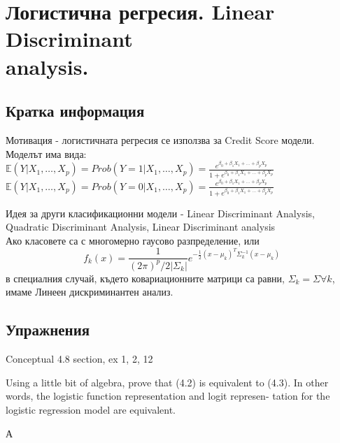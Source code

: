 \section{Логистична регресия. Linear Discriminant \\ analysis.}

	\subsection{Кратка информация}
	Мотивация - логистичната регресия се използва за Credit Score модели.\\
	Моделът има вида: \\
	$\mathbb{E}(Y|X_1, \dots, X_p) = Prob(Y=1|X_1, \dots, X_p) = \frac{e^{\beta_0 + \beta_1 X_1 + \dots + \beta_p X_p}}{1+ e^{\beta_0 + \beta_1 X_1 + \dots + \beta_p X_p}} $ \\
	$\mathbb{E}(Y|X_1, \dots, X_p) = Prob(Y=0|X_1, \dots, X_p) = \frac{e^{\beta_0 + \beta_1 X_1 + \dots + \beta_p X_p}}{1+ e^{\beta_0 + \beta_1 X_1 + \dots + \beta_p X_p}} $
	
	Идея за други класификационни модели - Linear Discriminant Analysis, Quadratic Discriminant Analysis, 
	Linear Discriminant analysis \\
	Ако класовете са с многомерно гаусово разпределение, или
	$$f_k(x) = \frac{1}{(2\pi)^p/2 \left | \Sigma_k  \right |} e^{-\frac{1}{2} (x-\mu_k)^T \Sigma_k^{-1}(x-\mu_k)} $$
	в специалния случай, където ковариационните матрици са равни, $\Sigma_k = \Sigma \forall k$, имаме 
	Линеен дискриминантен анализ.
	
	
	\subsection{Упражнения}
	Conceptual 4.8 section, ex 1, 2, 12 \\

	\begin{exercise}
			Using a little bit of algebra, prove that (4.2) is equivalent to (4.3). In
		other words, the logistic function representation and logit represen-
		tation for the logistic regression model are equivalent.
	\end{exercise}

	\begin{exercise}
		А
	\end{exercise}


